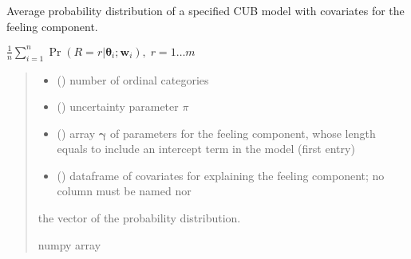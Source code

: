 \documentclass[letterpaper,10pt,english]{sphinxmanual}
\begin{document}
\begin{fulllineitems}
\label{\detokenize{cubmods:cubmods.cub_0w.pmf}}
\pysigstartsignatures
{}
\pysigstopsignatures
\sphinxAtStartPar
Average probability distribution of a specified CUB model 
with covariates for the feeling component.

\sphinxAtStartPar
\(\frac{1}{n} \sum_{i=1}^n \Pr(R = r | \pmb\theta_i ; \pmb w_i),\; r=1 \ldots m\)
\begin{quote}\begin{description}
\begin{itemize}
\item {} 
\sphinxAtStartPar
{} () \textendash{} number of ordinal categories

\item {} 
\sphinxAtStartPar
{} () \textendash{} uncertainty parameter \(\pi\)

\item {} 
\sphinxAtStartPar
{} () \textendash{} array \(\pmb \gamma\) of parameters for the feeling component, whose length equals 
 to include an intercept term in the model (first entry)

\item {} 
\sphinxAtStartPar
{} () \textendash{} dataframe of covariates for explaining the feeling component;
no column must be named  nor 

\end{itemize}

\sphinxAtStartPar
the vector of the probability distribution.

\sphinxAtStartPar
numpy array

\end{description}\end{quote}

\end{fulllineitems}
\end{document}
